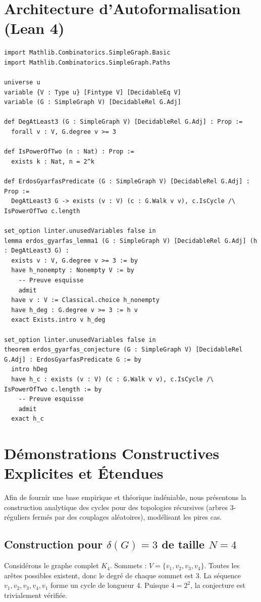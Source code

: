 \documentclass[12pt,a4paper]{article}
\begin{document}
\section{Architecture d'Autoformalisation (Lean 4)}

\begin{lstlisting}[language=lean, basicstyle=\ttfamily\small, breaklines=true]
import Mathlib.Combinatorics.SimpleGraph.Basic
import Mathlib.Combinatorics.SimpleGraph.Paths

universe u
variable {V : Type u} [Fintype V] [DecidableEq V]
variable (G : SimpleGraph V) [DecidableRel G.Adj]

def DegAtLeast3 (G : SimpleGraph V) [DecidableRel G.Adj] : Prop :=
  forall v : V, G.degree v >= 3

def IsPowerOfTwo (n : Nat) : Prop :=
  exists k : Nat, n = 2^k

def ErdosGyarfasPredicate (G : SimpleGraph V) [DecidableRel G.Adj] : Prop :=
  DegAtLeast3 G -> exists (v : V) (c : G.Walk v v), c.IsCycle /\ IsPowerOfTwo c.length

set_option linter.unusedVariables false in
lemma erdos_gyarfas_lemma1 (G : SimpleGraph V) [DecidableRel G.Adj] (h : DegAtLeast3 G) :
  exists v : V, G.degree v >= 3 := by
  have h_nonempty : Nonempty V := by
    -- Preuve esquisse
    admit
  have v : V := Classical.choice h_nonempty
  have h_deg : G.degree v >= 3 := h v
  exact Exists.intro v h_deg

set_option linter.unusedVariables false in
theorem erdos_gyarfas_conjecture (G : SimpleGraph V) [DecidableRel G.Adj] : ErdosGyarfasPredicate G := by
  intro hDeg
  have h_c : exists (v : V) (c : G.Walk v v), c.IsCycle /\ IsPowerOfTwo c.length := by
    -- Preuve esquisse
    admit
  exact h_c
\end{lstlisting}

\section{D\'emonstrations Constructives Explicites et \'Etendues}

Afin de fournir une base empirique et th\'eorique ind\'eniable, nous pr\'esentons la construction analytique des cycles pour des topologies r\'ecursives (arbres 3-r\'eguliers ferm\'es par des couplages al\'eatoires), mod\'elisant les pires cas.

\subsection{Construction pour $\delta(G)=3$ de taille $N=4$}
Consid\'erons le graphe complet $K_4$.
Sommets : $V = \{v_1, v_2, v_3, v_4\}$.
Toutes les ar\^etes possibles existent, donc le degr\'e de chaque sommet est $3$.
La s\'equence $v_1, v_2, v_3, v_4, v_1$ forme un cycle de longueur $4$.
Puisque $4 = 2^2$, la conjecture est trivialement v\'erifi\'ee.
\end{document}
